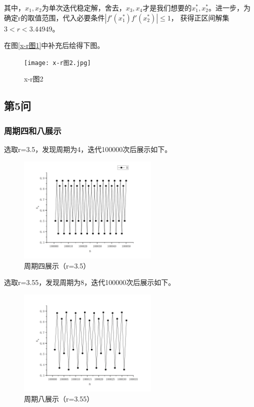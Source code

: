 \documentclass[10pt, a4paper]{article}
\begin{document}
    其中，$x_1,x_2$为单次迭代稳定解，舍去，$x_3,x_4$才是我们想要的$x_1^*,x_2^*$。进一步，为确定r的取值范围，代入必要条件$|f'(x_1^*)f'(x_2^*)|\le1$，
    获得正区间解集$3<r<3.44949$。

    在图\ref{x-r图1}中补充后绘得下图。

    \begin{figure}[H]
        \centering
        \texttt{[image: x-r图2.jpg]}
        \caption{x-r图2}\label{x-r图2}
    \end{figure}

    \subsection{第5问}
    \subsubsection{周期四和八展示}
    选取r=3.5，发现周期为4，迭代100000次后展示如下。

    \begin{figure}[H]
        \centering
        \includegraphics[width=0.6\textwidth]{周期四展示（r=3.5）.jpg}
        \caption{周期四展示（r=3.5）}\label{周期四展示（r=3.5）}
    \end{figure}

    选取r=3.55，发现周期为8，迭代100000次后展示如下。

    \begin{figure}[H]
        \centering
        \includegraphics[width=0.6\textwidth]{周期八展示（r=3.55）.jpg}
        \caption{周期八展示（r=3.55）}\label{周期八展示（r=3.55）}
    \end{figure}
\end{document}
